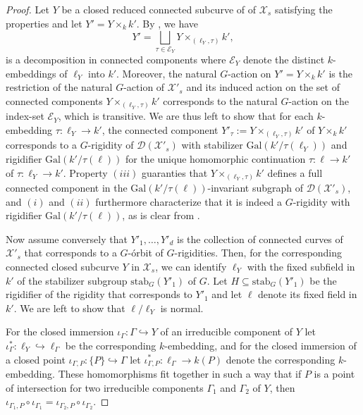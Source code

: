 \documentclass[a4paper,12pt,reqno]{amsart}
\newcommand\mc\mathcal
\theoremstyle{definition}
\numberwithin{equation}{thm}
\begin{document}
\begin{proof}
Let $Y$ be a closed reduced connected subcurve of  of $\mc{X}_s$ satisfying the properties and let $Y'=Y\times_k k'$.
By , we have  $$ Y'= \bigsqcup_{\tau \in \mc{E}_Y} Y \times_{(\ell_Y, \tau)} k',$$
is a decomposition in connected components where $\mc{E}_Y$ denote the distinct $k$-embeddings of $\ell_Y$ into $k'$. Moreover, the natural $G$-action on $Y'=Y\times_k k'$ is the restriction of the natural $G$-action of $\mc{X}'_s$ and its induced action on the set of connected components $Y \times_{(\ell_Y, \tau)} k'$ corresponds to the natural  $G$-action on the index-set $\mc{E}_Y$, which is transitive. 
We are thus left to show that for each $k$-embedding $\tau: \ell_Y \to k'$, the connected component
$Y'_\tau:=Y \times_{(\ell_Y, \tau)} k'$ of $Y\times_k k'$ corresponds to a $G$-rigidity of $\mc{D}(\mc{X}'_s)$  with stabilizer $\mathrm{Gal}(k'/ \tau(\ell_Y))$ and rigidifier $\mathrm{Gal}(k'/ \tau(\ell))$ for the unique homomorphic continuation  $\tau: \ell \to k'$  of $\tau: \ell_Y \to k'$.  Property $(iii)$ guaranties that  $Y\times_{(\ell_Y, \tau)} k'$ defines a full connected component in the $\mathrm{Gal}(k'/\tau(\ell))$-invariant subgraph of $\mc{D}(\mc{X}'_s)$, and $(i)$ and $(ii)$ furthermore characterize that it is indeed a $G$-rigidity with rigidifier $\mathrm{Gal}(k'/\tau(\ell))$, as is clear from .

Now assume conversely that 
$Y'_1, \ldots, Y'_d$ is the collection of connected curves of $\mc{X}'_s$ that corresponds to a $G$-\'orbit of $G$-rigidities.
Then, for the corresponding connected closed subcurve $Y$ in $\mc{X}_s$, we can identify $\ell_Y$ with the fixed subfield in $k'$ of the stabilizer subgroup $\mathrm{stab}_G(Y'_1)$ of $G$. Let $H \subseteq \mathrm{stab}_G(Y'_1)$ be the rigidifier of the rigidity that corresponds to $Y'_1$ and let $\ell$ denote its fixed field in $k'$. We are left to show that $\ell/ \ell_Y$ is normal. 

For the closed immersion $\iota_\Gamma: \Gamma \hookrightarrow Y$ of an irreducible component of $Y$ let $ \iota^*_{\Gamma}: \ell_Y \hookrightarrow \ell_\Gamma$ be the corresponding $k$-embedding, and for the closed immersion of a closed point $\iota_{\Gamma,P}: \{P\} \hookrightarrow \Gamma$ let  $\iota_{\Gamma,P}^*: \ell_\Gamma \to k(P)$ denote the corresponding $k$-embedding. These homomorphisms fit together in such a way that if $P$ is a point of intersection for two irreducible components $\Gamma_1$ and $\Gamma_2$ of $Y$, then $\iota_{\Gamma_1,P} \circ \iota_{\Gamma_1} =\iota_{\Gamma_2,P} \circ \iota_{\Gamma_2}$. 



\end{proof}
\end{document}
